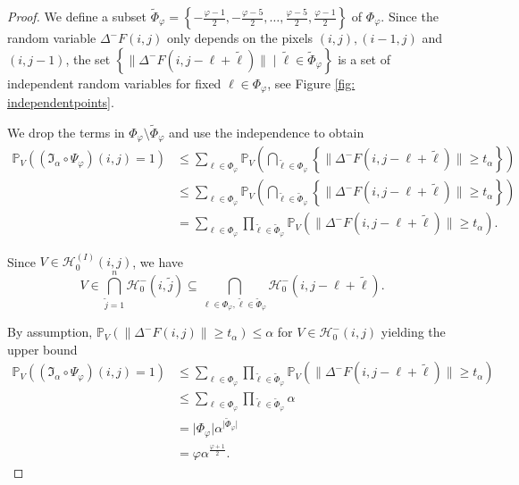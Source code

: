 \documentclass[a4paper,12pt]{article}
\newcommand{\abs}[1]{\lvert#1\rvert}
\newcommand{\norm}[1]{\lVert#1\rVert}
\theoremstyle{plain}
\theoremstyle{definition}
\numberwithin{equation}{section}
\begin{document}
\begin{proof}
	We define a subset $\tilde{\Phi}_\varphi = \left\{ -\frac{\varphi - 1}{2}, -\frac{\varphi - 5}{2}, \dots, \frac{\varphi - 5}{2}, \frac{\varphi - 1}{2} \right\}$ of $\Phi_\varphi$. Since the random variable $\Delta^- F(i, j)$ only depends on the pixels $(i, j), (i - 1, j)$ and $(i, j - 1)$, the set $\left\{ \norm{\Delta^- F(i, j - \ell + \tilde{\ell})} \mid \tilde{\ell} \in \tilde{\Phi}_\varphi \right\}$ is a set of independent random variables for fixed $\ell \in \Phi_\varphi$, see Figure \ref{fig: independentpoints}.
	
	
	
	We drop the terms in $\Phi_\varphi \setminus \tilde{\Phi}_\varphi$ and use the independence to obtain
	\begin{align*}
		\mathbb{P}_V\left( (\mathfrak{I}_\alpha \circ \Psi_\varphi)(i, j) = 1 \right) &\leq \sum_{\ell \in \Phi_\varphi} \mathbb{P}_V\left( \bigcap_{\tilde{\ell} \in \Phi_\varphi} \left\{ \norm{\Delta^- F(i, j - \ell + \tilde{\ell})} \geq t_\alpha \right\} \right) \\
		&\leq \sum_{\ell \in \Phi_\varphi} \mathbb{P}_V\left( \bigcap_{\tilde{\ell} \in \tilde{\Phi}_\varphi} \left\{ \norm{\Delta^- F(i, j - \ell + \tilde{\ell})} \geq t_\alpha \right\} \right) \\
		&= \sum_{\ell \in \Phi_\varphi} \prod_{\tilde{\ell} \in \tilde{\Phi}_\varphi} \mathbb{P}_V\left( \norm{\Delta^- F(i, j - \ell + \tilde{\ell})} \geq t_\alpha \right).
	\end{align*}
	
	Since $V \in \mathcal{H}_0^{(I)}(i, j)$, we have
	\begin{equation*}
		V \in \bigcap_{\tilde{j} = 1}^n \mathcal{H}_0^-(i, \tilde{j}) \subseteq \bigcap_{\ell \in \Phi_\varphi, \tilde{\ell} \in \tilde{\Phi}_\varphi} \mathcal{H}_0^-(i, j - \ell + \tilde{\ell}).
	\end{equation*}
	
	By assumption, $\mathbb{P}_V\left( \norm{\Delta^- F(i, j)} \geq t_\alpha \right) \leq \alpha$ for $V \in \mathcal{H}_0^-(i, j)$ yielding the upper bound
	\begin{align*}
		\mathbb{P}_V\left( (\mathfrak{I}_\alpha \circ \Psi_\varphi)(i, j) = 1 \right) &\leq \sum_{\ell \in \Phi_\varphi} \prod_{\tilde{\ell} \in \tilde{\Phi}_\varphi} \mathbb{P}_V\left( \norm{\Delta^- F(i, j - \ell + \tilde{\ell})} \geq t_\alpha \right) \\
		&\leq \sum_{\ell \in \Phi_\varphi} \prod_{\tilde{\ell} \in \tilde{\Phi}_\varphi} \alpha \\
		&= \abs{\Phi_\varphi} \alpha^{\abs{\tilde{\Phi}_\varphi}} \\
		&= \varphi \alpha^{\frac{\varphi + 1}{2}}.
	\end{align*}
	

\end{proof}
\end{document}
